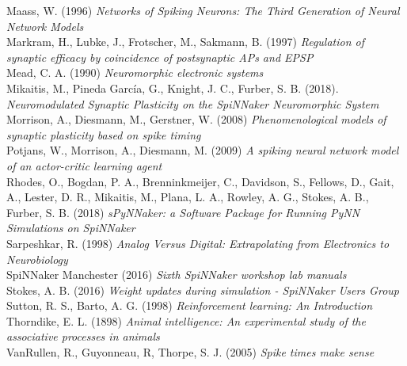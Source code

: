 \documentclass[10pt]{article}
\begin{document}
    \noindent
    Maass, W. (1996) \textit{Networks of Spiking Neurons: The Third Generation of Neural Network Models} \\[-3pt]

    \noindent
    Markram, H., Lubke, J., Frotscher, M., Sakmann, B. (1997) \textit{Regulation of synaptic efficacy by coincidence of postsynaptic APs and EPSP } \\[-3pt]

    \noindent
    Mead, C. A. (1990) \textit{Neuromorphic electronic systems} \\[-3pt]

    \noindent
    Mikaitis, M., Pineda García, G., Knight, J. C., Furber, S. B. (2018).  \textit{Neuromodulated Synaptic Plasticity on the SpiNNaker Neuromorphic System} \\[-3pt]

    \noindent
    Morrison, A., Diesmann, M., Gerstner, W. (2008) \textit{Phenomenological models of synaptic plasticity based on spike timing} \\[-3pt]

    \noindent
    Potjans, W., Morrison, A., Diesmann, M. (2009) \textit{A spiking neural network model of an actor-critic learning agent} \\[-3pt]

    \noindent
    Rhodes, O., Bogdan, P. A., Brenninkmeijer, C., Davidson, S., Fellows, D., Gait, A., Lester, D. R., Mikaitis, M., Plana, L. A., Rowley, A. G., Stokes, A. B., Furber, S. B. (2018) \textit{sPyNNaker: a Software Package for Running PyNN
    Simulations on SpiNNaker} \\[-3pt]

    \noindent
    Sarpeshkar, R. (1998) \textit{Analog Versus Digital: Extrapolating from Electronics to Neurobiology} \\[-3pt]

    \noindent
    SpiNNaker Manchester (2016) \textit{Sixth SpiNNaker workshop lab manuals} \\[-3pt]

    \noindent
    Stokes, A. B. (2016) \textit{Weight updates during simulation - SpiNNaker Users Group} \\[-3pt]

    \noindent
    Sutton, R. S., Barto, A. G. (1998) \textit{Reinforcement learning: An Introduction} \\[-3pt]

    \noindent
    Thorndike, E. L. (1898) \textit{Animal intelligence: An experimental study of the associative processes in animals} \\[-3pt]

    \noindent
    VanRullen, R., Guyonneau, R, Thorpe, S. J. (2005) \textit{Spike times make sense} \\[-3pt]
    
    
\end{document}

